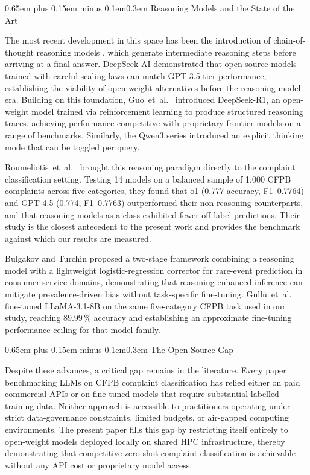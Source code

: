 \documentclass[10pt,a4paper,twocolumn]{article}
\makeatletter
\renewcommand\subsection{\@startsection{subsection}{2}{0pt}%
  {0.65em plus 0.15em minus 0.1em}{0.3em}%
  {\normalfont\normalsize\itshape}}
\makeatother
\begin{document}
\subsection{Reasoning Models and the State of the Art}

The most recent development in this space has been the introduction of
chain-of-thought reasoning models \cite{wei2022chainofthought}, which
generate intermediate reasoning steps before arriving at a final answer.
DeepSeek-AI \cite{deepseekllm2024} demonstrated that open-source models
trained with careful scaling laws can match GPT-3.5 tier performance,
establishing the viability of open-weight alternatives before the
reasoning model era. Building on this foundation, Guo~et~al.\
\cite{guo2025deepseekr1} introduced DeepSeek-R1, an open-weight model
trained via reinforcement learning to produce structured reasoning
traces, achieving performance competitive with proprietary frontier
models on a range of benchmarks. Similarly, the
Qwen3 series \cite{qwen2025qwen3} introduced an explicit thinking mode
that can be toggled per query.

Roumeliotis~et~al.\ \cite{roumeliotis2025think} brought this reasoning
paradigm directly to the complaint classification setting. Testing
14 models on a balanced sample of 1,000 CFPB complaints across five
categories, they found that o1 (0.777 accuracy, F1~0.7764) and
GPT-4.5 (0.774, F1~0.7763) outperformed their non-reasoning
counterparts, and that reasoning models as a class exhibited fewer
off-label predictions. Their study is the closest antecedent to the
present work and provides the benchmark against which our results
are measured.

Bulgakov and Turchin \cite{bulgakov2026deepseek} proposed a two-stage
framework combining a reasoning model with a lightweight logistic-regression
corrector for rare-event prediction in consumer service domains,
demonstrating that reasoning-enhanced inference can mitigate
prevalence-driven bias without task-specific fine-tuning. G{\"u}ll{\"u}~et~al.\
\cite{gullu2025llama} fine-tuned LLaMA-3.1-8B on the same five-category
CFPB task used in our study, reaching 89.99\,\% accuracy and
establishing an approximate fine-tuning performance ceiling for that
model family.

\subsection{The Open-Source Gap}

Despite these advances, a critical gap remains in the literature. Every
paper benchmarking LLMs on CFPB complaint classification has relied
either on paid commercial APIs or on fine-tuned models that require
substantial labelled training data. Neither approach is accessible to
practitioners operating under strict data-governance constraints,
limited budgets, or air-gapped computing environments. The present
paper fills this gap by restricting itself entirely to open-weight
models deployed locally on shared HPC infrastructure, thereby
demonstrating that competitive zero-shot complaint classification is
achievable without any API cost or proprietary model access.
\end{document}
